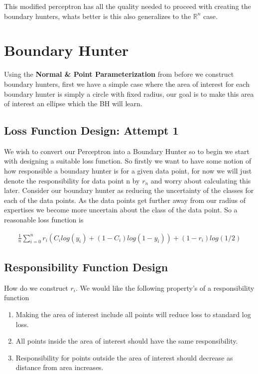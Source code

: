 \documentclass{article}
\theoremstyle{definition}
\begin{document}
This modified perceptron has all the quality needed to proceed with creating the boundary hunters, whats better is this also generalizes to the $\mathbb{R}^n$ case.

\section{Boundary Hunter}
Using the \textbf{Normal \& Point Parameterization} from before we construct boundary hunters, first we have a simple case where the area of interest for each boundary hunter is simply a circle with fixed radius, our goal is to make this area of interest an ellipse which the BH will learn.

\subsection{Loss Function Design: Attempt 1}
We wish to convert our Perceptron into a Boundary Hunter so to begin we start with designing a suitable loss function. So firstly we want to have some notion of how responsible a boundary hunter is for a given data point, for now we will just denote the responsibility for data point n by $r_n$ and worry about calculating this later. Consider our boundary hunter as reducing the uncertainty of the classes for each of the data points. As the data points get further away from our radius of expertises we become more uncertain about the class of the data point. So a reasonable loss function is 

\begin{align}
\frac{1}{n} \sum_{i=0}^n r_i(C_i log(y_i) + (1-C_i)log(1-y_i)) + (1-r_i) log(1/2)
\end{align}


\subsection{Responsibility Function Design}
How do we construct $r_i$. We would like the following property's of a responsibility function

\begin{enumerate}
\item Making the area of interest include all points will reduce loss to standard log loss.
\item All points inside the area of interest should have the same responsibility.
\item Responsibility for points outside the area of interest should decrease as distance from area increases.
\end{enumerate}
\end{document}
